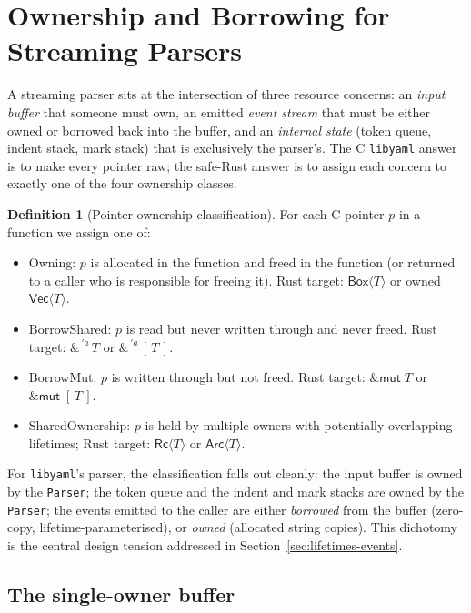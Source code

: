 \documentclass[12pt]{article}
\theoremstyle{definition}
\newtheorem{definition}[theorem]{Definition}
\theoremstyle{remark}
\newcommand{\lifetime}[1]{\ensuremath{\,'\!#1}}
\newcommand{\borrow}[2]{\ensuremath{\&^{#1}\,#2}}
\newcommand{\mutborrow}[1]{\ensuremath{\&\mathsf{mut}\;#1}}
\newcommand{\owned}[1]{\ensuremath{\mathsf{Box}\langle #1\rangle}}
\newcommand{\Vecc}[1]{\ensuremath{\mathsf{Vec}\langle #1\rangle}}
\newcommand{\Slice}[1]{\ensuremath{[\,#1\,]}}
\begin{document}
\section{Ownership and Borrowing for Streaming Parsers}
\label{sec:ownership-streaming}

A streaming parser sits at the intersection of three resource concerns: an
\emph{input buffer} that someone must own, an emitted \emph{event stream} that
must be either owned or borrowed back into the buffer, and an \emph{internal
state} (token queue, indent stack, mark stack) that is exclusively the
parser's. The C \texttt{libyaml} answer is to make every pointer raw;
the safe-Rust answer is to assign each concern to exactly one of the four
ownership classes.

\begin{definition}[Pointer ownership classification]
\label{def:ownership-class}
For each C pointer $p$ in a function we assign one of:
\begin{itemize}[leftmargin=2em]
\item \textsf{Owning}: $p$ is allocated in the function and freed in the
function (or returned to a caller who is responsible for freeing it).
Rust target: $\owned{T}$ or owned $\Vecc{T}$.
\item \textsf{BorrowShared}: $p$ is read but never written through and
never freed.
Rust target: $\borrow{\lifetime{a}}{T}$ or $\borrow{\lifetime{a}}{\Slice{T}}$.
\item \textsf{BorrowMut}: $p$ is written through but not freed.
Rust target: $\mutborrow{T}$ or $\mutborrow{\Slice{T}}$.
\item \textsf{SharedOwnership}: $p$ is held by multiple owners with potentially
overlapping lifetimes; Rust target: $\mathsf{Rc}\langle T\rangle$ or
$\mathsf{Arc}\langle T\rangle$.
\end{itemize}
\end{definition}

For \texttt{libyaml}'s parser, the classification falls out cleanly: the input
buffer is owned by the \texttt{Parser}; the token queue and the indent and
mark stacks are owned by the \texttt{Parser}; the events emitted to the
caller are either \emph{borrowed} from the buffer
(zero-copy, lifetime-parameterised), or \emph{owned} (allocated string copies).
This dichotomy is the central design tension addressed in
Section~\ref{sec:lifetimes-events}.

\subsection{The single-owner buffer}
\end{document}
